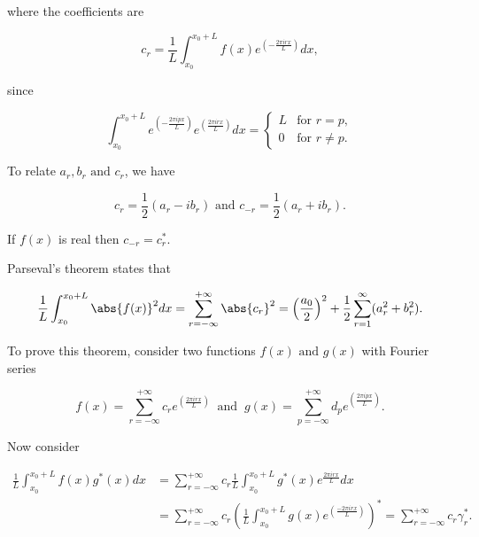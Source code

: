 \documentclass[english,a4paper,12pt]{report}
\begin{document}
where the coefficients are 

\begin{equation}
    c_{r} = \frac{1}{L} \int_{x_0 }^{x_0 + L} f(x)e^{\left( -\frac{2\pi irx}{L}  \right)}dx,     
\end{equation}

since

\begin{equation}
    \int_{x_0 }^{x_0 + L} e^{\left( -\frac{2\pi ipx}{L}\right)} e^{\left( \frac{2\pi irx}{L} \right)} dx = \begin{cases} L & \text{for } r=p, \\ 0 & \text{for } r\neq p.\end{cases}   
\end{equation}

To relate \(a_{r},b_{r} \text { and } c_{r}  \), we have

\begin{equation}
    c_{r} = \frac{1}{2} (a_{r} -ib_{r}  ) \text { and } c_{-r} = \frac{1}{2}(a_{r} + ib_{r}  ).   
\end{equation}

If \(f(x)\) is real then \(c_{-r} = c_{r}^*  \).

Parseval's theorem states that 

\begin{equation}
    \frac{1}{L} \int_{x_0 }^{x_0 + L} \abs{f(x)}^2 dx = \sum_{r=-\infty}^{+\infty} \abs{c_{r} }^2 = \left(\frac{a_0 }{2} \right)^2 + \frac{1}{2} \sum_{r=1}^{\infty} (a_{r}^2 + b_{r}^2).         
\end{equation}

To prove this theorem, consider two functions \(f(x) \text { and } g(x)\) with Fourier series 

\begin{equation}
    f(x) = \sum_{r=-\infty}^{+\infty} c_{r} e^{\left( \frac{2\pi irx}{L}  \right)} ~\text { and }~ g(x) = \sum_{p=-\infty}^{+\infty} d_{p} e^{\left( \frac{2\pi ipx}{L}  \right)}.      
\end{equation}

Now consider 

\begin{equation}
    \begin{aligned} 
    \frac{1}{L} \int_{x_0 }^{x_0 + L} f(x)g^*(x)dx &= \sum_{r=-\infty}^{+\infty} c_{r} \frac{1}{L} \int_{x_0 }^{x_0 + L} g^*(x) e^{\frac{2\pi irx}{L} }dx \\ &= \sum_{r=-\infty}^{+\infty} c_{r} \left( \frac{1}{L} \int_{x_0 }^{x_0 + L} g(x) e^{\left( \frac{-2\pi irx}{L}  \right)}   \right)^* = \sum_{r=-\infty}^{+\infty} c_{r} \gamma _{r}^*.            
    \end{aligned} 
\end{equation}
\end{document}
